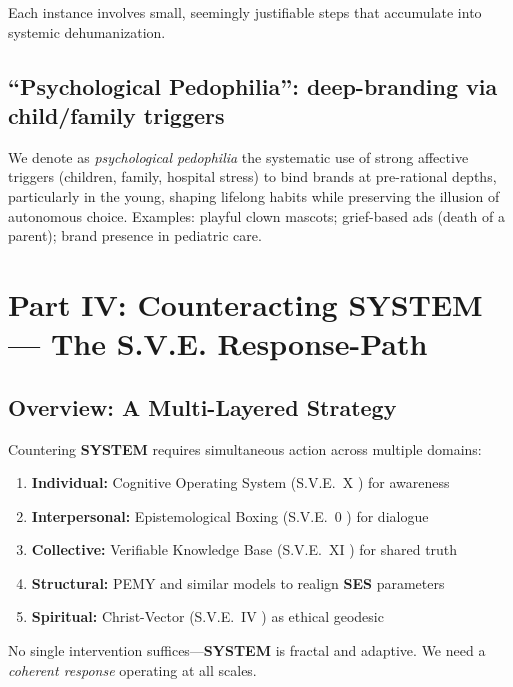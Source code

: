 \documentclass[11pt,a4paper]{article}
\newcommand{\SYSTEM}{\textbf{SYSTEM}}
\newcommand{\SES}{\textbf{SES}}
\theoremstyle{definition}
\theoremstyle{remark}
\begin{document}
Each instance involves small, seemingly justifiable steps that accumulate into systemic dehumanization.

\subsection{``Psychological Pedophilia'': deep-branding via child/family triggers}
\label{subsec:psy_pedophilia}

We denote as \emph{psychological pedophilia} the systematic use of strong affective triggers (children, family, hospital stress) to bind brands at pre-rational depths, particularly in the young, shaping lifelong habits while preserving the illusion of autonomous choice. Examples: playful clown mascots; grief-based ads (death of a parent); brand presence in pediatric care. %


\newpage

\section{Part IV: Counteracting \SYSTEM{} --- The S.V.E. Response-Path}

\subsection{Overview: A Multi-Layered Strategy}

Countering \SYSTEM{} requires simultaneous action across multiple domains:

\begin{enumerate}
    \item \textbf{Individual:} Cognitive Operating System (S.V.E.~X \cite{sve10}) for awareness
    \item \textbf{Interpersonal:} Epistemological Boxing (S.V.E.~0 \cite{sve0}) for dialogue
    \item \textbf{Collective:} Verifiable Knowledge Base (S.V.E.~XI \cite{sve11}) for shared truth
    \item \textbf{Structural:} PEMY and similar models to realign \SES{} parameters
    \item \textbf{Spiritual:} Christ-Vector (S.V.E.~IV \cite{sve4}) as ethical geodesic
\end{enumerate}

No single intervention suffices---\SYSTEM{} is fractal and adaptive. We need a \textit{coherent response} operating at all scales.
\end{document}
